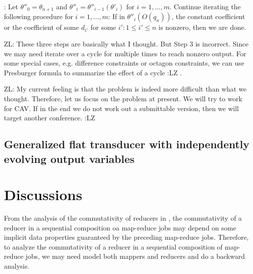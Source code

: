 \documentclass[11pt]{article}
\newcommand{\zhilin}[1]{\color{cyan} {ZL: #1 :LZ} \color{black}}
\begin{document}
\smallskip

: Let $\theta''_0=\theta_{n+1}$ and $\theta''_i = \theta''_{i-1}(\theta'_i)$ for $i = 1, \dots, m$.  Continue iterating the following procedure for $i = 1, \dots, m$:   If in $\theta''_i(O(q_n))$, the constant coefficient or the coefficient of some $d_{i'}$ for some $i': 1 \le i' \le n$ is nonzero, then we are done. 

\zhilin{These three steps are basically what I thought. But Step 3 is incorrect. Since we may need iterate over a cycle for multiple times to reach nonzero output. For some special cases, e.g. difference constraints or octagon constraints, we can use Presburger formula to summarize the effect of a cycle}.

\zhilin{My current feeling is that the problem is indeed more difficult than what we thought. Therefore, let us focus on the problem at present. We will try to work for CAV. If in the end we do not work out a submittable version, then we will target another conference.}

\subsection{Generalized flat transducer with independently evolving output variables}

\section{Discussions}

From the analysis of the commutativity of reducers in \cite{XZZ+14}, the commutativity of a reducer in a sequential composition oa map-reduce jobs may depend on some implicit data properties guaranteed by the preceding map-reduce jobs. Therefore, to analyze the commutativity of a reducer in a sequential composition of map-reduce jobs, we may need model both mappers and reducers and do a backward analysis.





\begin{appendix}



\end{appendix}
\end{document}
